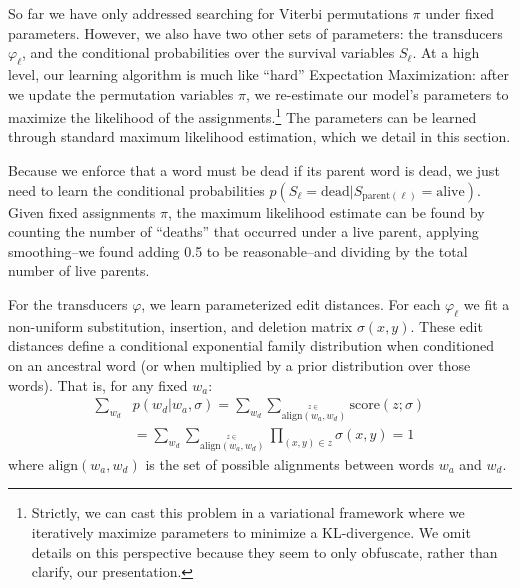 \documentclass[11pt,a4paper]{article}
\begin{document}
So far we have only addressed searching for Viterbi permutations
$\pi$ under fixed parameters. However, we also have two other sets
of parameters: the transducers $\varphi_\ell$, and the conditional
probabilities over the survival variables $S_\ell$.  At a high
level, our learning algorithm is much like ``hard'' Expectation
Maximization: after we update the permutation variables $\pi$, we
re-estimate our model's parameters to maximize the likelihood of
the assignments.\footnote{Strictly, we can cast this problem 
in a variational framework where we iteratively maximize parameters
to minimize a KL-divergence. We omit details on this perspective because they seem to
only obfuscate, rather than clarify, our presentation.} The parameters can be learned
through standard maximum likelihood estimation, which we detail in
this section.

Because we enforce that a word must be dead if its parent word is
dead, we just need to learn the conditional probabilities
$p(S_\ell=\mathrm{dead}| S_{\mathrm{parent}(\ell)}=\mathrm{alive})$.
Given fixed assignments $\pi$, the maximum likelihood estimate can
be found by counting the number of ``deaths'' that occurred under
a live parent, applying smoothing--we found adding 0.5 to be
reasonable--and dividing by the total number of live parents.

For the transducers $\varphi$, we learn parameterized edit
distances. For each $\varphi_\ell$ we fit a non-uniform substitution,
insertion, and deletion matrix $\sigma(x,y)$. These edit distances
define a conditional exponential family distribution when conditioned
on an ancestral word (or when multiplied by a prior distribution
over those words). That is, for any fixed $w_a$:
\begin{equation*}
  \begin{split}
    \sum_{w_d} &p(w_d|w_a,\sigma) = \sum_{w_d} \sum_{\stackrel{z\in}{\scriptscriptstyle\mathrm{align}(w_a,w_d)}} \mathrm{score}(z;\sigma) \\
    &= \sum_{w_d} \sum_{\stackrel{z\in}{\scriptscriptstyle\mathrm{align}(w_a,w_d)}} \prod_{(x,y)\in z} \sigma(x,y) = 1
   \end{split}
 \end{equation*}
where $\mathrm{align}(w_a,w_d)$ is the set of possible alignments between words $w_a$ and $w_d$.
\end{document}
